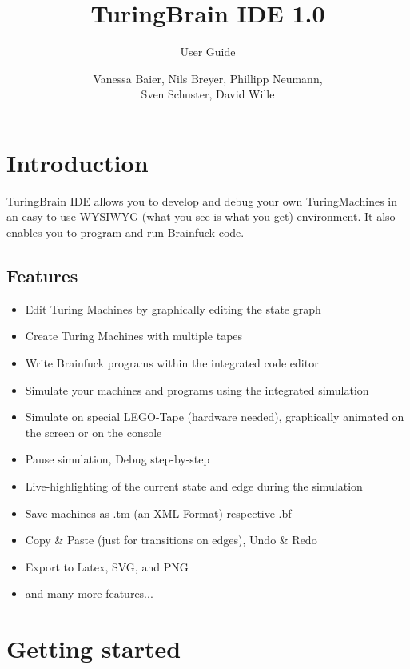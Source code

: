 \documentclass[%
  a4paper,%
  11pt,%
  blue,%
  hyperref	%
  ]{tubsartcl}
\title{TuringBrain IDE \LARGE 1.0}
\subtitle{User Guide}
\author{\small Vanessa Baier, Nils Breyer, Phillipp Neumann,\\ Sven Schuster, David Wille}
\begin{document}
\maketitle[image,logo=right]%

\tableofcontents
\clearpage
\section{Introduction}

TuringBrain IDE allows you to develop and debug your own TuringMachines in an easy to use WYSIWYG (what you see is what you get) environment. It also enables you to program and run Brainfuck code.

\subsection{Features}

\begin{itemize}
  \item Edit Turing Machines by graphically editing the state graph
  \item Create Turing Machines with multiple tapes
  \item Write Brainfuck programs within the integrated code editor
  \item Simulate your machines and programs using the integrated simulation
  \item Simulate on special LEGO-Tape (hardware needed), graphically animated on the screen or on the console
  \item Pause simulation, Debug step-by-step
  \item Live-highlighting of the current state and edge during the simulation
  \item Save machines as .tm (an XML-Format) respective .bf
  \item Copy \& Paste (just for transitions on edges), Undo \& Redo
  \item Export to Latex, SVG, and PNG
  \item and many more features...
\end{itemize}

\section{Getting started}
\end{document}
